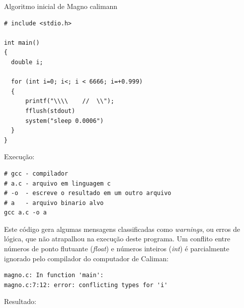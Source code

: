 \begin{example}{Algoritmo inicial de Magno calimann}
\begin{verbatim}
# include <stdio.h>

int main()
{
  double i;
  
  for (int i=0; i<; i < 6666; i=+0.999)
  {
      printf("\\\\    //  \\");
      fflush(stdout)
      system("sleep 0.0006")
  }
}
\end{verbatim}

Execução:

\begin{verbatim}
# gcc - compilador
# a.c - arquivo em linguagem c
# -o  - escreve o resultado em um outro arquivo
# a   - arquivo binario alvo
gcc a.c -o a
\end{verbatim}

Este código gera algumas mensagens classificadas como \emph{warnings}, ou erros de lógica, que não atrapalhou na execução deste programa. Um conflito entre números de ponto flutuante (\emph{float}) e números inteiros (\emph{int}) é parcialmente ignorado pelo compilador do computador de Caliman:

\begin{verbatim}
magno.c: In function 'main':
magno.c:7:12: error: conflicting types for 'i'
\end{verbatim}

Resultado:


\end{example}
